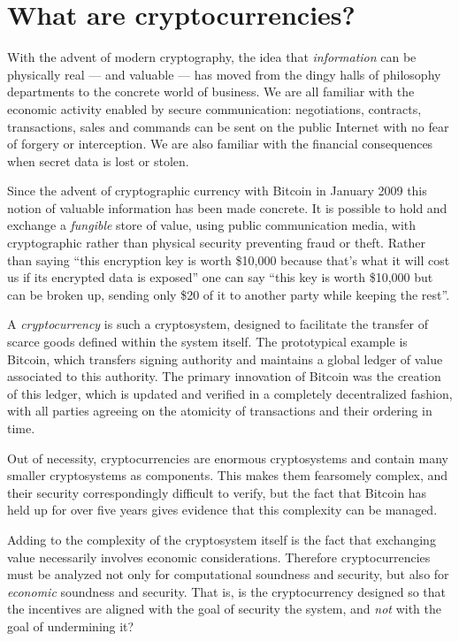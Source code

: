 \documentclass[letterpaper]{article}
\begin{document}
\section{What are cryptocurrencies?}

With the advent of modern cryptography, the idea that \emph{information} can be
physically real --- and valuable --- has moved from the dingy halls of philosophy
departments to the concrete world of business. We are all familiar with the
economic activity enabled by secure communication: negotiations, contracts,
transactions, sales and commands can be sent on the public Internet with no fear
of forgery or interception. We are also familiar with the financial consequences
when secret data is lost or stolen.

Since the advent of cryptographic currency with Bitcoin in January 2009 \cite{satoshi}
this notion of valuable information has been made concrete. It is
possible to hold and exchange a \emph{fungible} store of value, using public
communication media, with cryptographic rather than physical security preventing
fraud or theft. Rather than saying ``this encryption key is worth \$10,000 because
that's what it will cost us if its encrypted data is exposed'' one can say ``this
key is worth \$10,000 but can be broken up, sending only \$20 of it to another
party while keeping the rest''.

A \emph{cryptocurrency} is such a cryptosystem, designed to facilitate the transfer
of scarce goods defined within the system itself. The prototypical example is
Bitcoin, which transfers signing authority and maintains a global ledger of value
associated to this authority. The primary innovation of Bitcoin was the creation
of this ledger, which is updated and verified in a completely decentralized
fashion, with all parties agreeing on the atomicity of transactions and their
ordering in time.

Out of necessity, cryptocurrencies are enormous cryptosystems and contain many
smaller cryptosystems as components. This makes them fearsomely complex, and
their security correspondingly difficult to verify, but the fact that Bitcoin
has held up for over five years gives evidence that this complexity can be
managed.

Adding to the complexity of the cryptosystem itself is the fact that exchanging
value necessarily involves economic considerations. Therefore cryptocurrencies
must be analyzed not only for computational soundness and security, but also
for \emph{economic} soundness and security. That is, is the cryptocurrency
designed so that the incentives are aligned with the goal of security the system,
and \emph{not} with the goal of undermining it?
\end{document}
